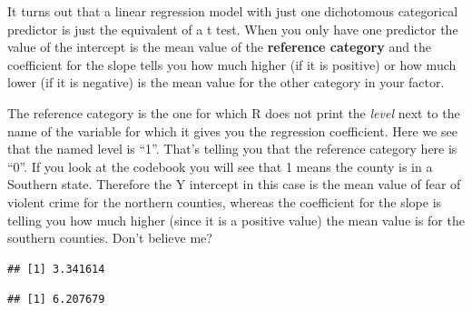 \documentclass[]{book}
\newenvironment{Shaded}{\begin{snugshade}}{\end{snugshade}}
\newcommand{\DataTypeTok}[1]{\textcolor[rgb]{0.13,0.29,0.53}{#1}}
\newcommand{\DecValTok}[1]{\textcolor[rgb]{0.00,0.00,0.81}{#1}}
\newcommand{\KeywordTok}[1]{\textcolor[rgb]{0.13,0.29,0.53}{\textbf{#1}}}
\newcommand{\NormalTok}[1]{#1}
\newcommand{\OperatorTok}[1]{\textcolor[rgb]{0.81,0.36,0.00}{\textbf{#1}}}
\newcommand{\OtherTok}[1]{\textcolor[rgb]{0.56,0.35,0.01}{#1}}
\newcommand{\StringTok}[1]{\textcolor[rgb]{0.31,0.60,0.02}{#1}}
\begin{document}
It turns out that a linear regression model with just one dichotomous categorical predictor is just the equivalent of a t test. When you only have one predictor the value of the intercept is the mean value of the \textbf{reference category} and the coefficient for the slope tells you how much higher (if it is positive) or how much lower (if it is negative) is the mean value for the other category in your factor.

The reference category is the one for which R does not print the \emph{level} next to the name of the variable for which it gives you the regression coefficient. Here we see that the named level is ``1''. That's telling you that the reference category here is ``0''. If you look at the codebook you will see that 1 means the county is in a Southern state. Therefore the Y intercept in this case is the mean value of fear of violent crime for the northern counties, whereas the coefficient for the slope is telling you how much higher (since it is a positive value) the mean value is for the southern counties. Don't believe me?

\begin{Shaded}
\end{Shaded}

\begin{verbatim}
## [1] 3.341614
\end{verbatim}

\begin{Shaded}
\end{Shaded}

\begin{verbatim}
## [1] 6.207679
\end{verbatim}
\end{document}
